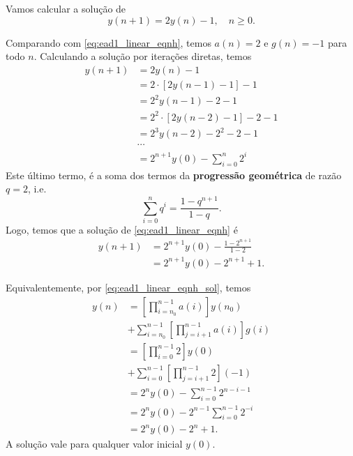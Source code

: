 \begin{ex}
  Vamos calcular a solução de
  \begin{equation}\label{eq:ex_ead1_lin_enh}
    y(n+1) = 2y(n) - 1,\quad n\geq 0.
  \end{equation}

  Comparando com \eqref{eq:ead1_linear_eqnh}, temos $a(n) = 2$ e $g(n)=-1$ para todo $n$. Calculando a solução por iterações diretas, temos
  \begin{align}
    y(n+1) &= 2y(n)-1 \\
            &= 2\cdot \left[2y(n-1)-1\right]-1 \\
            &= 2^2y(n-1)-2-1 \\
            &= 2^2\cdot \left[2y(n-2)-1\right]-2-1 \\
            &= 2^3y(n-2)-2^2-2-1 \\
            &\cdots \\
            &= 2^{n+1}y(0)-\sum_{i=0}^{n}2^i
  \end{align}
  Este último termo, é a soma dos termos da {\bf progressão geométrica} de razão $q=2$, i.e.
  \begin{equation}
    \sum_{i=0}^n q^i = \frac{1-q^{n+1}}{1-q}.
  \end{equation}
  Logo, temos que a solução de \eqref{eq:ead1_linear_eqnh} é
  \begin{align}
    y(n+1) &= 2^{n+1}y(0) - \frac{1-2^{n+1}}{1-2} \\
           &= 2^{n+1}y(0) -2^{n+1}+1.
  \end{align}
  
  Equivalentemente, por \eqref{eq:ead1_linear_eqnh_sol}, temos
  \begin{align}
    y(n) &= \left[\prod_{i=n_0}^{n-1} a(i)\right]y(n_0) \\
         &+ \sum_{i=n_0}^{n-1}\left[\prod_{j=i+1}^{n-1} a(i)\right]g(i) \\
         &= \left[\prod_{i=0}^{n-1} 2\right]y(0) \\
         &+ \sum_{i=0}^{n-1}\left[\prod_{j=i+1}^{n-1} 2\right](-1) \\
         &= 2^ny(0) - \sum_{i=0}^{n-1}2^{n-i-1}\\
         &= 2^ny(0) - 2^{n-1}\sum_{i=0}^{n-1}2^{-i}\\
         &= 2^ny(0) - 2^{n} + 1. \label{eq:ex_ead1_linear_eqnh_sol}
  \end{align}
  A solução vale para qualquer valor inicial $y(0)$.


\end{ex}
